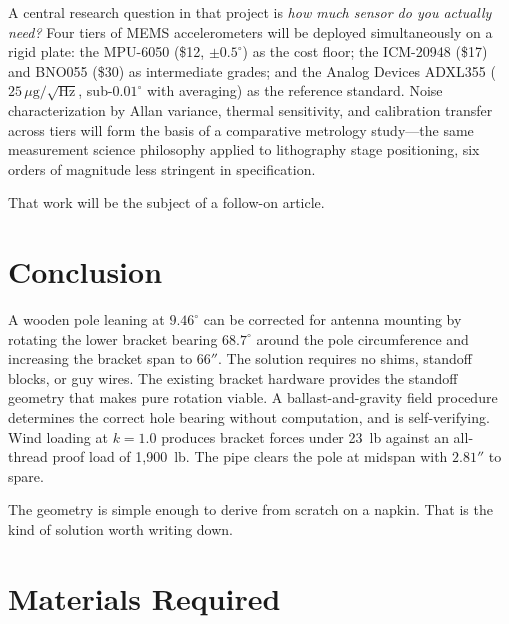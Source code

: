\documentclass[11pt,twocolumn]{article}
\begin{document}
A central research question in that project is \emph{how much sensor do you
actually need?} Four tiers of MEMS accelerometers will be deployed
simultaneously on a rigid plate: the MPU-6050 (\$12, $\pm 0.5^\circ$) as the
cost floor; the ICM-20948 (\$17) and BNO055 (\$30) as intermediate grades;
and the Analog Devices ADXL355 ($25\,\mu\text{g}/\sqrt{\text{Hz}}$, sub-$0.01^\circ$
with averaging) as the reference standard. Noise characterization by Allan
variance, thermal sensitivity, and calibration transfer across tiers will form
the basis of a comparative metrology study---the same measurement science
philosophy applied to lithography stage positioning, six orders of magnitude
less stringent in specification.

That work will be the subject of a follow-on article.

\section{Conclusion}

A wooden pole leaning at $9.46^\circ$ can be corrected for antenna mounting
by rotating the lower bracket bearing $68.7^\circ$ around the pole
circumference and increasing the bracket span to $66''$. The solution requires
no shims, standoff blocks, or guy wires. The existing bracket hardware provides
the standoff geometry that makes pure rotation viable. A ballast-and-gravity
field procedure determines the correct hole bearing without computation, and is
self-verifying. Wind loading at $k = 1.0$ produces bracket forces under 23~lb
against an all-thread proof load of 1,900~lb. The pipe clears the pole at
midspan with $2.81''$ to spare.

The geometry is simple enough to derive from scratch on a napkin. That is the
kind of solution worth writing down.

\section{Materials Required}
\end{document}
